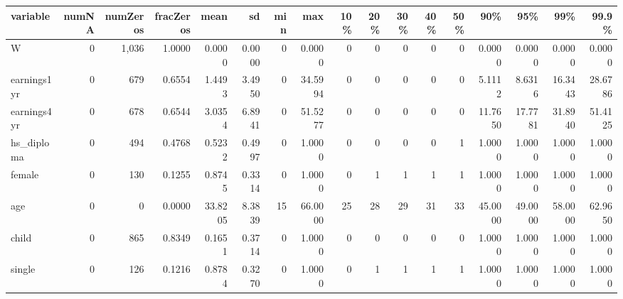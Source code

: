 
\begin{tabular}{lrrrrrrrrrrrrrrrr}
\toprule
variable & numNA & numZeros & fracZeros & mean & sd & min & max & 10\% & 20\% & 30\% & 40\% & 50\% & 90\% & 95\% & 99\% & 99.9\%\\
\midrule
W & 0 & 1,036 & 1.0000 & 0.0000 & 0.0000 & 0 & 0.0000 & 0 & 0 & 0 & 0 & 0 & 0.0000 & 0.0000 & 0.0000 & 0.0000\\
earnings1yr & 0 & 679 & 0.6554 & 1.4493 & 3.4950 & 0 & 34.5994 & 0 & 0 & 0 & 0 & 0 & 5.1112 & 8.6316 & 16.3443 & 28.6786\\
earnings4yr & 0 & 678 & 0.6544 & 3.0354 & 6.8941 & 0 & 51.5277 & 0 & 0 & 0 & 0 & 0 & 11.7650 & 17.7781 & 31.8940 & 51.4125\\
hs\_diploma & 0 & 494 & 0.4768 & 0.5232 & 0.4997 & 0 & 1.0000 & 0 & 0 & 0 & 0 & 1 & 1.0000 & 1.0000 & 1.0000 & 1.0000\\
female & 0 & 130 & 0.1255 & 0.8745 & 0.3314 & 0 & 1.0000 & 0 & 1 & 1 & 1 & 1 & 1.0000 & 1.0000 & 1.0000 & 1.0000\\
\addlinespace
age & 0 & 0 & 0.0000 & 33.8205 & 8.3839 & 15 & 66.0000 & 25 & 28 & 29 & 31 & 33 & 45.0000 & 49.0000 & 58.0000 & 62.9650\\
child & 0 & 865 & 0.8349 & 0.1651 & 0.3714 & 0 & 1.0000 & 0 & 0 & 0 & 0 & 0 & 1.0000 & 1.0000 & 1.0000 & 1.0000\\
single & 0 & 126 & 0.1216 & 0.8784 & 0.3270 & 0 & 1.0000 & 0 & 1 & 1 & 1 & 1 & 1.0000 & 1.0000 & 1.0000 & 1.0000\\
\bottomrule
\end{tabular}
